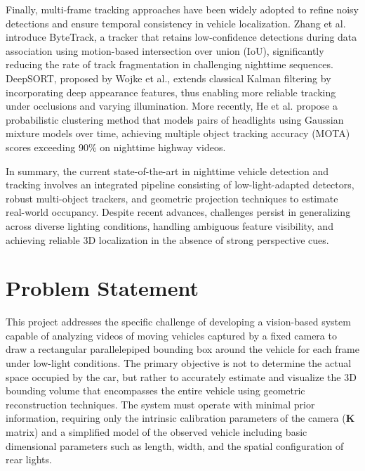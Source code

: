 Finally, multi-frame tracking approaches have been widely adopted to refine noisy detections and ensure temporal consistency in vehicle localization. Zhang et al.\cite{zhang2022bytetrack} introduce ByteTrack, a tracker that retains low-confidence detections during data association using motion-based intersection over union (IoU), significantly reducing the rate of track fragmentation in challenging nighttime sequences. DeepSORT, proposed by Wojke et al.\cite{wojke2017deepsort}, extends classical Kalman filtering by incorporating deep appearance features, thus enabling more reliable tracking under occlusions and varying illumination. More recently, He et al.\cite{Zou2017HeadlightPairing} propose a probabilistic clustering method that models pairs of headlights using Gaussian mixture models over time, achieving multiple object tracking accuracy (MOTA) scores exceeding 90\% on nighttime highway videos.

In summary, the current state-of-the-art in nighttime vehicle detection and tracking involves an integrated pipeline consisting of low-light-adapted detectors, robust multi-object trackers, and geometric projection techniques to estimate real-world occupancy. Despite recent advances, challenges persist in generalizing across diverse lighting conditions, handling ambiguous feature visibility, and achieving reliable 3D localization in the absence of strong perspective cues.
 

\section{Problem Statement}
This project addresses the specific challenge of developing a vision-based system capable of analyzing videos of moving vehicles captured by a fixed camera to draw a rectangular parallelepiped bounding box around the vehicle for each frame under low-light conditions. The primary objective is not to determine the actual space occupied by the car, but rather to accurately estimate and visualize the 3D bounding volume that encompasses the entire vehicle using geometric reconstruction techniques. The system must operate with minimal prior information, requiring only the intrinsic calibration parameters of the camera ($\mathbf{K}$ matrix) and a simplified model of the observed vehicle including basic dimensional parameters such as length, width, and the spatial configuration of rear lights.

